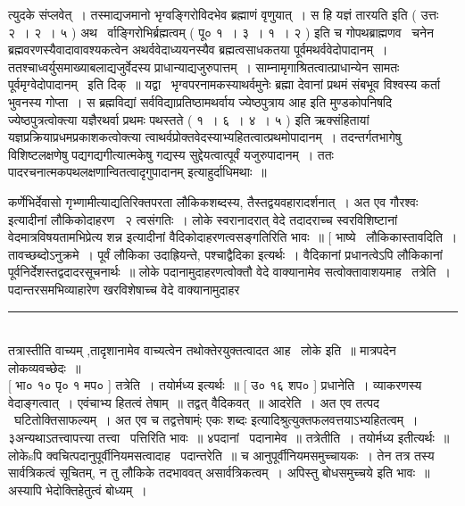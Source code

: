 \documentclass[11pt, openany]{book}
\begin{document}
\begin{multicols}{2}
\noindent
त्युदके संप्लवेत्~। तस्माद्यजमानो भृग्वङ्गिरोविदभेव ब्रह्माणं वृणुयात्~। स हि यज्ञं तारयति इति ( उत्तः २~। २~। ५ ) {\qt अथ \textendash\ र्वाङ्गिरोभिर्ब्रह्मत्वम्} ( पू० १~। ३~। १~। २ ) इति च गोपथब्राह्मणव \textendash\ चनेन ब्रह्मवरणस्यैवादावावश्यकत्वेन अथर्ववेदाध्ययनस्यैव ब्रह्मत्वसाधकतया पूर्वमथर्ववेदोपादानम्~। ततश्चाध्वर्युसमाख्याबलाद्यजुर्वेदस्य प्राधान्याद्यजुरुपात्तम्~। साम्नामृगाश्रितत्वात्प्राधान्येन सामतः पूर्वमृग्वेदोपादानम् \textendash\ इति दिक्~॥ यद्वा \textendash\ भृग्वपरनामकस्याथर्वमुनेः {\qt ब्रह्मा देवानां प्रथमं संबभूव विश्वस्य कर्ता भुवनस्य गोप्ता~। स ब्रह्मविद्यां सर्वविद्याप्रतिष्ठामथर्वाय ज्येष्ठपुत्राय आह} इति मुण्डकोपनिषदि ज्येष्ठपुत्रत्वोक्त्या {\qt यज्ञैरथर्वा प्रथमः पथस्तते} ( १~। ६~। ४~। ५ ) इति ऋक्संहितायां यज्ञप्रक्रियाप्रधमप्रकाशकत्वोक्त्या त्वाथर्वप्रोक्तवेदस्याभ्यहितत्वात्प्रथमोपादानम्~। तदन्तर्गतभागेषु विशिष्टलक्षणेषु पद्यगद्यगीत्यात्मकेषु गद्यस्य सुद्देयत्वात्पूर्वं यजुरुपादानम्~। ततः पादरचनात्मकपथलक्षणान्वितत्वादृगुपादानम् इत्याहुर्दाधिमथाः~॥

\columnbreak

\noindent
कर्णेभिर्देवासो गृभ्णामीत्याद्यतिरिक्तपरता लौकिकशब्दस्य, तैस्तद्वयवहारादर्शनात्~। अत एव गौरश्वः इत्यादीनां लौकिकोदाहरण \textendash\ २ त्वसंगतिः~। लोके स्वरानादरात् वेदे तदादराच्च स्वरविशिष्टानां वेदमात्रविषयतामभिप्रेत्य शन्न इत्यादीनां वैदिकोदाहरणत्वसङ्गतिरिति भावः~॥ [ भाष्ये \textendash\ लौकिकास्तावदिति~। तावच्छब्दोऽनुक्रमे~। पूर्वं लौकिका उदाह्रियन्ते, पश्चाद्वैदिका इत्यर्थः~। वैदिकानां प्रधानत्वेऽपि लौकिकानां पूर्वनिर्देशस्तद्वदादरसूचनार्थः~॥ लोके पदानामुदाहरणत्वोक्तौ वेदे वाक्यानामेव सत्वोक्तावाशयमाह \textendash\ तत्रेति~। पदान्तरसमभिव्याहारेण खरविशेषाच्च वेदे वाक्यानामुदाहर \textendash\ 

\noindent
\rule{1\linewidth}{0.5pt}\\

तत्रास्तीति वाच्यम् ,तादृशानामेव वाच्यत्वेन तथोक्तेरयुक्तत्वादत आह \textendash\ लोके इति~॥ मात्रपदेन लोकव्यवच्छेदः~॥\\

 [ भा० १० पृ० १ मप० ] तत्रेति~। तयोर्मध्य इत्यर्थः~॥ [ उ० १६ शप० ] प्रधानेति~। व्याकरणस्य वेदाङ्गत्वात्~। एवंचाभ्य हितत्वं तेषाम्~॥ तद्वत् वैदिकवत्~॥ आदरेति~। अत एव तत्पद \textendash\ घटितोक्तिसाफल्यम्~। अत एव च तद्वत्तेषाम्ंः एकः शब्दः इत्यादिश्रुत्युक्तफलवत्तयाऽभ्यहितत्वम्~। ३अन्यथाऽतत्त्वापत्त्या तत्त्वा \textendash\ पत्तिरिति भावः~॥ ४पदानां \textendash\ पदानामेव~॥ तत्रेतीति~। तयोर्मध्य इतीत्यर्थः~॥ लोकेsपि क्वचित्पदानुपूर्वीनियमसत्वादाह \textendash\ पदान्तरेति~॥ च आनुपूर्वीनियमसमुच्चायकः~। तेन तत्र तस्य सार्वत्रिकत्वं सूचितम्, न तु लौकिके तदभाववत् असार्वत्रिकत्वम्~। अपिस्तु बोधसमुच्चये इति भावः~॥ अस्यापि भेदोक्तिहेतुत्वं बोध्यम्~।\\


\end{multicols}
\end{document}
